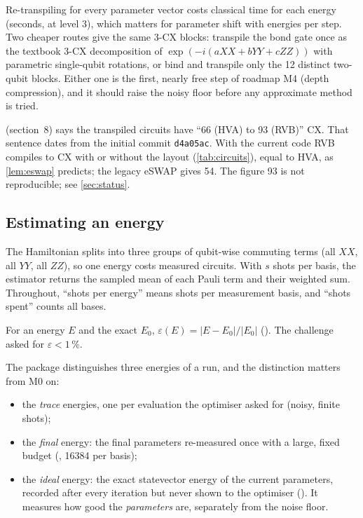 \begin{rem}
  Re-transpiling for every parameter vector costs classical time for each energy (seconds, at
  level 3), which matters for parameter shift with \VPsEnergiesHva{} energies per step. Two cheaper
  routes give the same 3-CX blocks: transpile the bond gate once as the textbook 3-CX
  decomposition of $\exp(-i(aXX+bYY+cZZ))$ with parametric single-qubit rotations, or bind and
  transpile only the 12 distinct two-qubit blocks. Either one is the first, nearly free step of
  roadmap M4 (depth compression), and it should raise the noisy floor before any approximate
  method is tried.
\end{rem}

\begin{rem}
   (section~8) says the transpiled circuits have ``66 (HVA) to 93 (RVB)''
  CX. That sentence dates from the initial commit \texttt{d4a05ac}. With the current code RVB
  compiles to \VCxRvb{} CX with or without the layout (\cref{tab:circuits}), equal to HVA, as
  \cref{lem:eswap} predicts; the legacy eSWAP gives 54. The figure 93 is not reproducible; see
  \cref{sec:status}.
\end{rem}

\subsection{Estimating an energy}

The Hamiltonian splits into three groups of qubit-wise commuting terms (all $XX$, all $YY$, all
$ZZ$), so one energy costs \VMeasGroups{} measured circuits. With $s$ shots per basis, the
estimator returns the sampled mean of each Pauli term and their weighted sum. Throughout,
``shots per energy'' means shots per measurement basis, and ``shots spent'' counts all bases.

\begin{dfn}
  For an energy $E$ and the exact $E_0$, $\varepsilon(E)=|E-E_0|/|E_0|$ ().
  The challenge asked for $\varepsilon<1\,\%$.
\end{dfn}

The package distinguishes three energies of a run, and the distinction matters from M0 on:
\begin{itemize}
  \item the \emph{trace} energies, one per evaluation the optimiser asked for (noisy, finite shots);
  \item the \emph{final} energy: the final parameters re-measured once with a large, fixed budget
    (, 16384 per basis);
  \item the \emph{ideal} energy: the exact statevector energy of the current parameters, recorded
    after every iteration but never shown to the optimiser (). It measures
    how good the \emph{parameters} are, separately from the noise floor.
\end{itemize}
